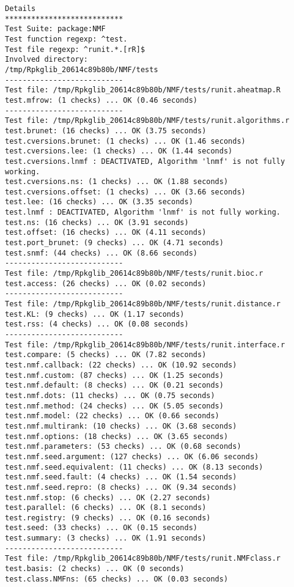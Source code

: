 \documentclass[10pt]{article}
\begin{document}
\begin{verbatim}
Details 
*************************** 
Test Suite: package:NMF 
Test function regexp: ^test. 
Test file regexp: ^runit.*.[rR]$ 
Involved directory: 
/tmp/Rpkglib_20614c89b80b/NMF/tests 
--------------------------- 
Test file: /tmp/Rpkglib_20614c89b80b/NMF/tests/runit.aheatmap.R 
test.mfrow: (1 checks) ... OK (0.46 seconds)
--------------------------- 
Test file: /tmp/Rpkglib_20614c89b80b/NMF/tests/runit.algorithms.r 
test.brunet: (16 checks) ... OK (3.75 seconds)
test.cversions.brunet: (1 checks) ... OK (1.46 seconds)
test.cversions.lee: (1 checks) ... OK (1.44 seconds)
test.cversions.lnmf : DEACTIVATED, Algorithm 'lnmf' is not fully working.
test.cversions.ns: (1 checks) ... OK (1.88 seconds)
test.cversions.offset: (1 checks) ... OK (3.66 seconds)
test.lee: (16 checks) ... OK (3.35 seconds)
test.lnmf : DEACTIVATED, Algorithm 'lnmf' is not fully working.
test.ns: (16 checks) ... OK (3.91 seconds)
test.offset: (16 checks) ... OK (4.11 seconds)
test.port_brunet: (9 checks) ... OK (4.71 seconds)
test.snmf: (44 checks) ... OK (8.66 seconds)
--------------------------- 
Test file: /tmp/Rpkglib_20614c89b80b/NMF/tests/runit.bioc.r 
test.access: (26 checks) ... OK (0.02 seconds)
--------------------------- 
Test file: /tmp/Rpkglib_20614c89b80b/NMF/tests/runit.distance.r 
test.KL: (9 checks) ... OK (1.17 seconds)
test.rss: (4 checks) ... OK (0.08 seconds)
--------------------------- 
Test file: /tmp/Rpkglib_20614c89b80b/NMF/tests/runit.interface.r 
test.compare: (5 checks) ... OK (7.82 seconds)
test.nmf.callback: (22 checks) ... OK (10.92 seconds)
test.nmf.custom: (87 checks) ... OK (1.25 seconds)
test.nmf.default: (8 checks) ... OK (0.21 seconds)
test.nmf.dots: (11 checks) ... OK (0.75 seconds)
test.nmf.method: (24 checks) ... OK (5.05 seconds)
test.nmf.model: (22 checks) ... OK (0.66 seconds)
test.nmf.multirank: (10 checks) ... OK (3.68 seconds)
test.nmf.options: (18 checks) ... OK (3.65 seconds)
test.nmf.parameters: (53 checks) ... OK (0.68 seconds)
test.nmf.seed.argument: (127 checks) ... OK (6.06 seconds)
test.nmf.seed.equivalent: (11 checks) ... OK (8.13 seconds)
test.nmf.seed.fault: (4 checks) ... OK (1.54 seconds)
test.nmf.seed.repro: (8 checks) ... OK (9.34 seconds)
test.nmf.stop: (6 checks) ... OK (2.27 seconds)
test.parallel: (6 checks) ... OK (8.1 seconds)
test.registry: (9 checks) ... OK (0.16 seconds)
test.seed: (33 checks) ... OK (0.15 seconds)
test.summary: (3 checks) ... OK (1.91 seconds)
--------------------------- 
Test file: /tmp/Rpkglib_20614c89b80b/NMF/tests/runit.NMFclass.r 
test.basis: (2 checks) ... OK (0 seconds)
test.class.NMFns: (65 checks) ... OK (0.03 seconds)

\end{verbatim}
\end{document}

